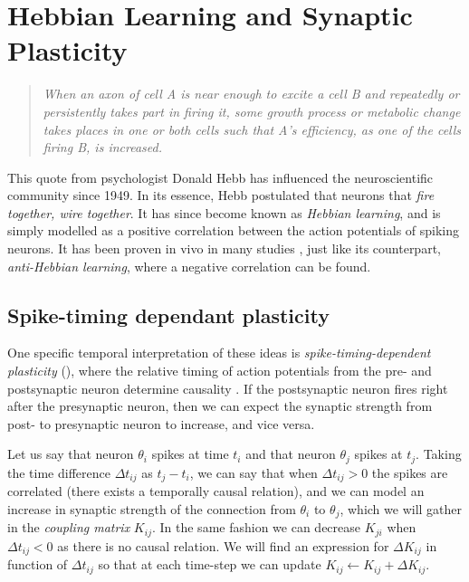 \newpage
\section{\theory Hebbian Learning and Synaptic Plasticity} \label{sec:HebbianLearningAndSynapticPlasticity}
\vspace{1mm}
\begin{quote}
\textsl{When an axon of cell A is near enough to excite a cell B and repeatedly or persistently takes part in firing it, some growth process or metabolic change takes places in one or both cells such that A's efficiency, as one of the cells firing B, is increased.}\cite{Hebb1949}
\end{quote}

This quote from psychologist Donald Hebb has influenced the neuroscientific community since 1949. In its essence, Hebb postulated that neurons that \textsl{fire together, wire together}. It has since become known as \textsl{Hebbian learning}, and is simply modelled as a positive correlation between the action potentials of spiking neurons. It has been proven in vivo in many studies \cite{ChrolCannon2014}, just like its counterpart, \textsl{anti-Hebbian learning}, where a negative correlation can be found.


\subsection{Spike-timing dependant plasticity}
One specific temporal interpretation of these ideas is \textsl{spike-timing-dependent plasticity} (\STDP), where the relative timing of action potentials from the pre- and postsynaptic neuron determine causality \cite{Kempter1999, Gerstner2002}. If the postsynaptic neuron fires right after the presynaptic neuron, then we can expect the synaptic strength from post- to presynaptic neuron to increase, and vice versa. 

Let us say that neuron $\theta_i$ spikes at time $t_i$ and that neuron $\theta_j$ spikes at $t_j$. Taking the time difference $\Delta t_{ij}$ as $t_j - t_i$, we can say that when $\Delta t_{ij} > 0$ the spikes are correlated (there exists a temporally causal relation), and we can model an increase in synaptic strength of the connection from $\theta_i$ to $\theta_j$, which we will gather in the \textsl{coupling matrix} $K_{ij}$. In the same fashion we can decrease $K_{ji}$ when $\Delta t_{ij} < 0$ as there is no causal relation. We will find an expression for $\Delta K_{ij}$ in function of $\Delta t_{ij}$ so that at each time-step we can update $K_{ij} \leftarrow K_{ij} + \Delta K_{ij}$.\\

